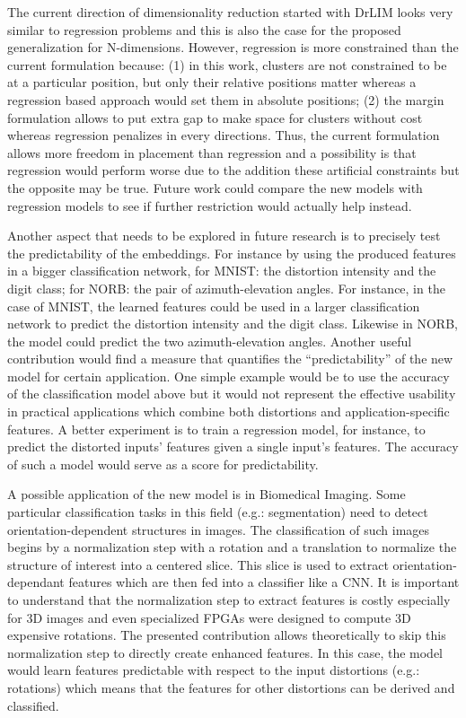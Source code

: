 \documentclass[a4paper,12pt]{report}
\newcommand{\eg}{e.g.}
\begin{document}
The current direction of dimensionality reduction started with DrLIM looks very similar to regression problems and this is also the case for the proposed generalization for N-dimensions.
However, regression is more constrained than the current formulation because: (1) in this work, clusters are not constrained to be at a particular position, but only their relative positions matter whereas a regression based approach would set them in absolute positions; (2) the margin formulation allows to put extra gap to make space for clusters without cost whereas regression penalizes in every directions.
Thus, the current formulation allows more freedom in placement than regression and a possibility is that regression would perform worse due to the addition these artificial constraints but the opposite may be true.
Future work could compare the new models with regression models to see if further restriction would actually help instead.

Another aspect that needs to be explored in future research is to precisely test the predictability of the embeddings.
For instance by using the produced features in a bigger classification network, for MNIST: the distortion intensity and the digit class; for NORB: the pair of azimuth-elevation angles.
For instance, in the case of MNIST, the learned features could be used in a larger classification network to predict the distortion intensity and the digit class.
Likewise in NORB, the model could predict the two azimuth-elevation angles.
Another useful contribution would find a measure that quantifies the ``predictability'' of the new model for certain application.
One simple example would be to use the accuracy of the classification model above but it would not represent the effective usability in practical applications which combine both distortions and application-specific features.
A better experiment is to train a regression model, for instance, to predict the distorted inputs' features given a single input's features.
The accuracy of such a model would serve as a score for predictability.


A possible application of the new model is in Biomedical Imaging.
Some particular classification tasks in this field (\eg: segmentation) need to detect orientation-dependent structures in images.
The classification of such images begins by a normalization step with a rotation and a translation to normalize the structure of interest into a centered slice.
This slice is used to extract orientation-dependant features which are then fed into a classifier like a CNN.
It is important to understand that the normalization step to extract features is costly especially for 3D images and even specialized FPGAs were designed to compute 3D expensive rotations.
The presented contribution allows theoretically to skip this normalization step to directly create enhanced features.
In this case, the model would learn features predictable with respect to the input distortions (\eg: rotations) which means that the features for other distortions can be derived and classified.
\end{document}
